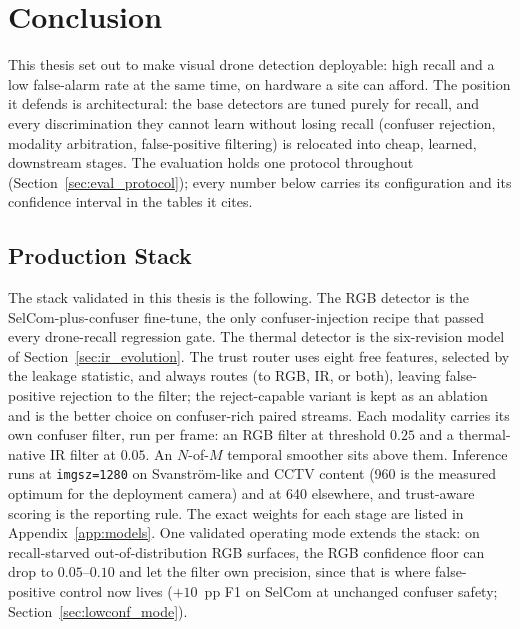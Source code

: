 \chapter{Conclusion}
\label{ch:conclusion}

This thesis set out to make visual drone detection deployable: high recall and a low false-alarm rate at the same time, on hardware a site can afford. The position it defends is architectural: the base detectors are tuned purely for recall, and every discrimination they cannot learn without losing recall (confuser rejection, modality arbitration, false-positive filtering) is relocated into cheap, learned, downstream stages. The evaluation holds one protocol throughout (Section~\ref{sec:eval_protocol}); every number below carries its configuration and its confidence interval in the tables it cites.

\section{Production Stack}
\label{sec:production_stack}

The stack validated in this thesis is the following. The RGB detector is the SelCom-plus-confuser fine-tune, the only confuser-injection recipe that passed every drone-recall regression gate. The thermal detector is the six-revision model of Section~\ref{sec:ir_evolution}. The trust router uses eight free features, selected by the leakage statistic, and always routes (to RGB, IR, or both), leaving false-positive rejection to the filter; the reject-capable variant is kept as an ablation and is the better choice on confuser-rich paired streams. Each modality carries its own confuser filter, run per frame: an RGB filter at threshold $0.25$ and a thermal-native IR filter at $0.05$. An $N$-of-$M$ temporal smoother sits above them. Inference runs at \texttt{imgsz=1280} on Svanstr\"om-like and CCTV content (960 is the measured optimum for the deployment camera) and at 640 elsewhere, and trust-aware scoring is the reporting rule. The exact weights for each stage are listed in Appendix~\ref{app:models}. One validated operating mode extends the stack: on recall-starved out-of-distribution RGB surfaces, the RGB confidence floor can drop to $0.05$--$0.10$ and let the filter own precision, since that is where false-positive control now lives ($+10$~pp F1 on SelCom at unchanged confuser safety; Section~\ref{sec:lowconf_mode}).

